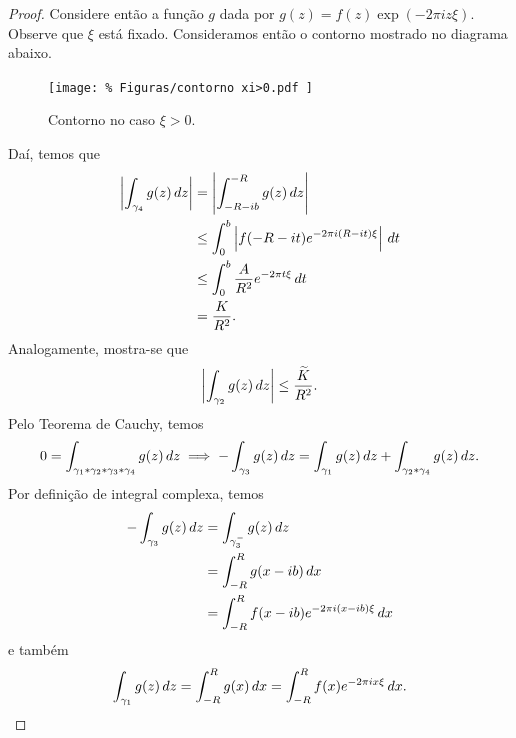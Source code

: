 \begin{proof}
            Considere então a função $g$ dada por $g(z) = f(z)\exp(-2\pi iz\xi)$. Observe que $\xi$
            está fixado. Consideramos então o contorno mostrado no diagrama abaixo.
            \begin{figure}[H]\centering 
				\texttt{[image: \%
				    Figuras/contorno xi>0.pdf
				]}
				\caption{Contorno no caso $\xi > 0$.}
			\end{figure}
            Daí, temos que
            \begin{align*}
                \left|\int_{\gamma_4} g(z) \, dz\right| &= \left|\int_{-R-ib}^{-R} g(z) \, dz\right| \\
                                                        &\leq \int_0^b \left| f(-R-it)e^{-2\pi i(R-it)\xi}
                                                        \right|\, dt \\
                                                        &\leq \int_0^b \frac{A}{R^2}e^{-2\pi t\xi} \, dt \\
                                                        &= \frac{K}{R^2}.
            \end{align*}
            Analogamente, mostra-se que
            \begin{equation*}
                \left|\int_{\gamma_2} g(z) \, dz\right| \leq \frac{\widetilde{K}}{R^2}.
            \end{equation*}
            Pelo Teorema de Cauchy, temos
            \begin{align*}
                0 = \int_{\gamma_1*\gamma_2*\gamma_3*\gamma_4} g(z) \, dz 
                \implies -\int_{\gamma_3} g(z) \, dz = \int_{\gamma_1} g(z) \, dz 
                                                     + \int_{\gamma_2*\gamma_4} g(z) \, dz.
            \end{align*}
            Por definição de integral complexa, temos
            \begin{align*}
                -\int_{\gamma_3} g(z) \, dz &= \int_{\gamma_3^-} g(z) \, dz \\
                                            &= \int_{-R}^R g(x-ib) \, dx \\
                                            &= \int_{-R}^R f(x-ib)e^{-2\pi i(x-ib)\xi} \, dx
            \end{align*}
            e também
            \begin{equation*}
                \int_{\y_1} g(z) \, dz = \int_{-R}^R g(x) \, dx = \int_{-R}^R f(x)e^{-2\pi ix\xi} \, dx.

\end{equation*}
\end{proof}
